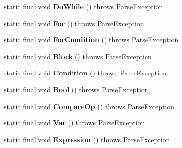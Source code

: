 \begin{DoxyCompactItemize}
\item 
static final void {\bfseries Do\+While} ()  throws Parse\+Exception \hypertarget{classpack_1_1_my_new_grammar_a751f4b2c0b18bca48bcb6f6d2909cd14}{}\label{classpack_1_1_my_new_grammar_a751f4b2c0b18bca48bcb6f6d2909cd14}

\item 
static final void {\bfseries For} ()  throws Parse\+Exception \hypertarget{classpack_1_1_my_new_grammar_abfabc729ed991cb18bd1a85e3514eb6f}{}\label{classpack_1_1_my_new_grammar_abfabc729ed991cb18bd1a85e3514eb6f}

\item 
static final void {\bfseries For\+Condition} ()  throws Parse\+Exception \hypertarget{classpack_1_1_my_new_grammar_a4f0f33ab92bb699b272ecd1c93502b1d}{}\label{classpack_1_1_my_new_grammar_a4f0f33ab92bb699b272ecd1c93502b1d}

\item 
static final void {\bfseries Block} ()  throws Parse\+Exception \hypertarget{classpack_1_1_my_new_grammar_a2a6a0c4b55a5ec5c7c3e7485b4adb742}{}\label{classpack_1_1_my_new_grammar_a2a6a0c4b55a5ec5c7c3e7485b4adb742}

\item 
static final void {\bfseries Condition} ()  throws Parse\+Exception \hypertarget{classpack_1_1_my_new_grammar_a369e4908fc3777cdc3adbc3e979e743a}{}\label{classpack_1_1_my_new_grammar_a369e4908fc3777cdc3adbc3e979e743a}

\item 
static final void {\bfseries Bool} ()  throws Parse\+Exception \hypertarget{classpack_1_1_my_new_grammar_a6a16be97e1adb9d7d764c7b91b50a12e}{}\label{classpack_1_1_my_new_grammar_a6a16be97e1adb9d7d764c7b91b50a12e}

\item 
static final void {\bfseries Compare\+Op} ()  throws Parse\+Exception \hypertarget{classpack_1_1_my_new_grammar_ac8a333e5562f795fc80ba441a72ab972}{}\label{classpack_1_1_my_new_grammar_ac8a333e5562f795fc80ba441a72ab972}

\item 
static final void {\bfseries Var} ()  throws Parse\+Exception \hypertarget{classpack_1_1_my_new_grammar_a24195f0ef14295490ef63d743c70ef24}{}\label{classpack_1_1_my_new_grammar_a24195f0ef14295490ef63d743c70ef24}

\item 
static final void {\bfseries Expression} ()  throws Parse\+Exception \hypertarget{classpack_1_1_my_new_grammar_a0cdceb16e950d82722c618d21ef85b82}{}\label{classpack_1_1_my_new_grammar_a0cdceb16e950d82722c618d21ef85b82}


\end{DoxyCompactItemize}
